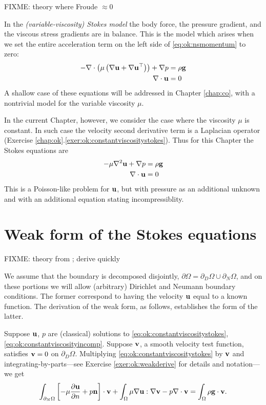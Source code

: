 FIXME: theory where Froude $\approx 0$

In the \emph{(variable-viscosity) Stokes model} the body force, the pressure gradient, and the viscous stress gradients are in balance.  This is the model which arises when we set the entire acceleration term on the left side of \eqref{eq:ok:nsmomentum} to zero:
\begin{align}
- \nabla\cdot \left(\mu \left(\nabla \mathbf{u} + \nabla \mathbf{u}^{\top}\right)\right) + \nabla p &= \rho \mathbf{g} \label{eq:ok:varstokesmomentum} \\
\nabla\cdot \mathbf{u} &= 0 \label{eq:ok:varstokesincomp}
\end{align}
A shallow case of these equations will be addressed in Chapter \ref{chap:co}, with a nontrivial model for the variable viscosity $\mu$.

In the current Chapter, however, we consider the case where the viscosity $\mu$ is constant.  In such case the velocity second derivative term is a Laplacian operator (Exercise \ref{chap:ok}.\ref{exer:ok:constantviscositystokes}).  Thus for this Chapter the Stokes equations are
\begin{align}
- \mu \nabla^2 \mathbf{u} + \nabla p &= \rho \mathbf{g}  \label{eq:ok:constantviscositystokes} \\
\nabla\cdot \mathbf{u} &= 0  \label{eq:ok:constantviscosityincomp}
\end{align}
This is a Poisson-like problem for $\mathbf{u}$, but with pressure as an additional unknown and with an additional equation stating incompressiblity.


\section{Weak form of the Stokes equations}

FIXME: theory from \citep{Braess2007,Elmanetal2005}; derive quickly

We assume that the boundary is decomposed disjointly, $\partial\Omega = \partial_D\Omega \cup \partial_N\Omega$, and on these portions we will allow (arbitrary) Dirichlet and Neumann boundary conditions.  The former correspond to having the velocity $\mathbf{u}$ equal to a known function.  The derivation of the weak form, as follows, establishes the form of the latter.

Suppose $\mathbf{u}$, $p$ are (classical) solutions to \eqref{eq:ok:constantviscositystokes}, \eqref{eq:ok:constantviscosityincomp}.  Suppose $\mathbf{v}$, a smooth velocity test function, satisfies $\mathbf{v}=0$ on $\partial_D\Omega$.  Multiplying \eqref{eq:ok:constantviscositystokes} by $\mathbf{v}$ and integrating-by-parts---see Exercise \ref{exer:ok:weakderive} for details and notation---we get
\begin{equation}
\int_{\partial_N \Omega} \left[- \mu \frac{\partial \mathbf{u}}{\partial n} + p \mathbf{n} \right] \cdot \mathbf{v} + \int_\Omega \mu \nabla \mathbf{u} : \nabla \mathbf{v} - p \nabla\cdot \mathbf{v} = \int_\Omega \rho \mathbf{g} \cdot \mathbf{v}. \label{eq:ok:weakstokeswithboundary}
\end{equation}

